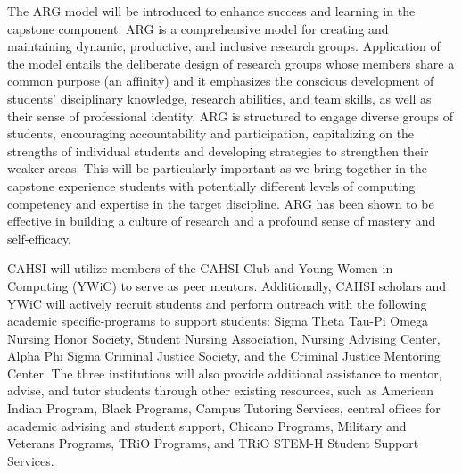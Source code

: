 The ARG model will be introduced to enhance success and learning in the capstone component. ARG \cite{arg1,arg2} is a comprehensive model for creating and maintaining dynamic, productive, and inclusive research groups. Application of the model entails the deliberate design of research groups whose members share a common purpose (an affinity) and it emphasizes the conscious development of students’ disciplinary knowledge, research abilities, and team
skills, as well as their sense of professional identity. ARG is structured to engage diverse groups of students, encouraging accountability and participation, capitalizing on the strengths of individual students and developing strategies to strengthen their weaker areas. This will be particularly important as we bring together in the capstone experience students with potentially different levels of computing competency and expertise in the target discipline. ARG has been shown to be effective in building a culture of research and a profound sense of mastery and self-efficacy.


CAHSI will utilize members of the CAHSI Club and Young Women in Computing (YWiC) to serve as peer mentors. Additionally, CAHSI scholars and YWiC will actively recruit students and perform outreach with the following academic specific-programs to support students: Sigma Theta Tau-Pi Omega Nursing Honor Society, Student Nursing Association, Nursing Advising Center, Alpha Phi Sigma Criminal Justice Society, and the Criminal Justice Mentoring Center. The three institutions will also provide additional assistance to mentor, advise, and tutor students through other existing resources, such as American Indian Program, Black Programs, Campus Tutoring Services, central offices for academic advising and student support, Chicano Programs, Military and Veterans Programs, TRiO Programs, and TRiO STEM-H Student Support Services. 